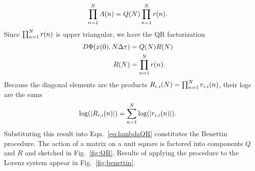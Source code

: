 \begin{equation*}
  \prod_{n=1}^N {A}{(n)} ={Q}{(N)} \prod_{n=1}^N {r}{(n)}.
\end{equation*}
Since $\prod_{n=1}^N {r}{(n)}$ is upper triangular, we have the QR
factorization
\begin{align}
  \label{eq:QR1}
  D \Phi( {x}{(0)}, N \Delta\tau ) &= {Q}{(N)} {R}{(N)} \\
  \label{eq:QR2}
  {R}{(N)} &= \prod_{n=1}^N {r}{(n)}.
\end{align}
Because the diagonal elements are the products
${R_{i,i}}{(N)} = \prod_{n=1}^N {r_{i,i}}{(n)}$, their logs are the
sums
\begin{equation}
  \label{eq:rii}
  \log( \left| {R_{i,i}}{(n)} \right| ) = \sum_{n=1}^N \log( \left|
    {r_{i,i}}{(n)} \right| ).
\end{equation}
Substituting this result into Eqn.~\eqref{eq:lambdaQR} constitutes the
Benettin procedure.  The action of a matrix on a unit square is
factored into components $Q$ and $R$ and sketched in
Fig.~\ref{fig:QR}.  Results of applying the procedure to the Lorenz
system appear in Fig.~\ref{fig:benettin}.
